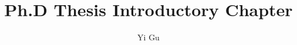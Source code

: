 \documentclass[10pt]{article}
\author{Yi Gu}
\begin{document}
\title{Ph.D Thesis Introductory Chapter}

\maketitle

\tableofcontents


\pagebreak


\end{document}
